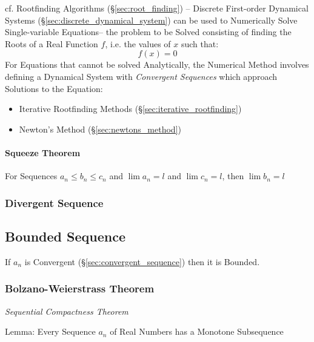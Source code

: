 \fist cf. Rootfinding Algorithms (\S\ref{sec:root_finding}) -- Discrete
First-order Dynamical Systems (\S\ref{sec:discrete_dynamical_system}) can be
used to Numerically Solve Single-variable Equations-- the problem to be Solved
consisting of finding the Roots of a Real Function $f$, i.e. the values of $x$
such that:
\[
  f(x) = 0
\]
For Equations that cannot be solved Analytically, the Numerical Method involves
defining a Dynamical System with \emph{Convergent Sequences} which approach
Solutions to the Equation:
\begin{itemize}
  \item Iterative Rootfinding Methods (\S\ref{sec:iterative_rootfinding})
  \item Newton's Method (\S\ref{sec:newtons_method})
\end{itemize}



\paragraph{Squeeze Theorem}\label{sec:squeeze_theorem}\hfill

For Sequences $a_n \leq b_n \leq c_n$ and $\lim a_n = l$ and $\lim c_n
= l$, then $\lim b_n = l$



\subsubsection{Divergent Sequence}\label{sec:divergent_sequence}



\subsection{Bounded Sequence}\label{sec:bounded_sequence}

If $a_n$ is Convergent (\S\ref{sec:convergent_sequence}) then it is
Bounded.



\subsubsection{Bolzano-Weierstrass Theorem}\label{sec:bolzano_weierstrass}

\emph{Sequential Compactness Theorem}

Lemma: Every Sequence $a_n$ of Real Numbers has a Monotone
Subsequence

